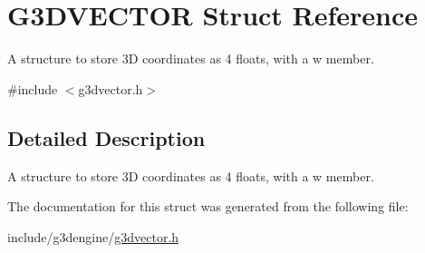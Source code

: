 \hypertarget{structG3DVECTOR}{}\section{G3\+D\+V\+E\+C\+T\+OR Struct Reference}
\label{structG3DVECTOR}


A structure to store 3D coordinates as 4 floats, with a w member.  




{\ttfamily \#include $<$g3dvector.\+h$>$}



\subsection{Detailed Description}
A structure to store 3D coordinates as 4 floats, with a w member. 

The documentation for this struct was generated from the following file\+:\begin{DoxyCompactItemize}
\item 
include/g3dengine/\hyperlink{g3dvector_8h}{g3dvector.\+h}\end{DoxyCompactItemize}
